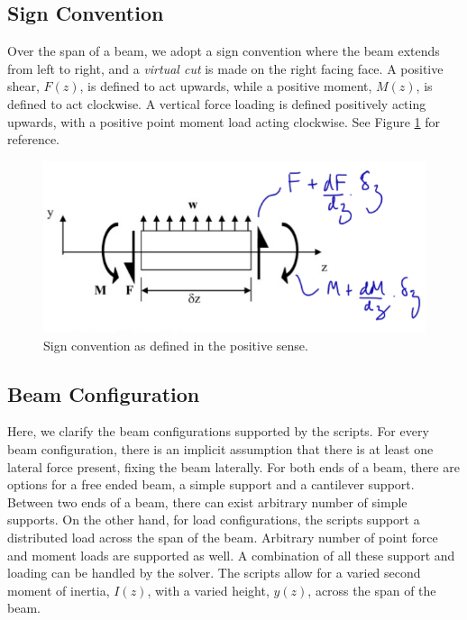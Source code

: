 \documentclass[11pt,a4paper]{article}
\begin{document}
\subsection{Sign Convention}
Over the span of a beam, we adopt a sign convention where the beam extends from left to right, and a \textit{virtual cut} is made on the right facing face. A positive shear, $F(z)$, is defined to act upwards, while a positive moment, $M(z)$, is defined to act clockwise. A vertical force loading is defined positively acting upwards, with a positive point moment load acting clockwise. See Figure \ref{fig:sign_convention} for reference.
\begin{figure}[H]
\centering
	\includegraphics[scale=0.8]{sign_convention.png}
	\caption{Sign convention as defined in the positive sense.}
	\label{fig:sign_convention}
\end{figure}
\subsection{Beam Configuration}
Here, we clarify the beam configurations supported by the scripts. For every beam configuration, there is an implicit assumption that there is at least one lateral force present, fixing the beam laterally. For both ends of a beam, there are options for a free ended beam, a simple support and a cantilever support. Between two ends of a beam, there can exist arbitrary number of simple supports. On the other hand, for load configurations, the scripts support a distributed load across the span of the beam. Arbitrary number of point force and moment loads are supported as well. A combination of all these support and loading can be handled by the solver. The scripts allow for a varied second moment of inertia, $I(z)$, with a varied height, $y(z)$, across the span of the beam.
\newpage
\end{document}
